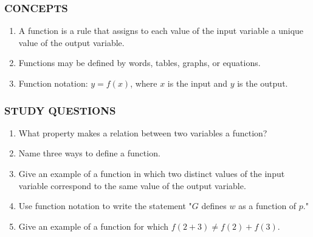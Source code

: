\documentclass[10pt,]{book}
\theoremstyle{plain}
\theoremstyle{definition}
\theoremstyle{definition}
\theoremstyle{definition}
\theoremstyle{definition}
\numberwithin{equation}{part}
\begin{document}
\subsubsection[{CONCEPTS}]{CONCEPTS}\label{subsubsection-6}
\leavevmode%
\begin{enumerate}[label=\arabic*]
\item\hypertarget{li-327}{}A function is a rule that assigns to each value of the input variable a unique value of the output variable.%
\item\hypertarget{li-328}{}Functions may be defined by words, tables, graphs, or equations.%
\item\hypertarget{li-329}{}Function notation: \(y = f (x)\), where \(x\) is the input and \(y\) is the output.%
\end{enumerate}
%
\typeout{************************************************}
\typeout{************************************************}
\subsubsection[{STUDY QUESTIONS}]{STUDY QUESTIONS}\label{subsubsection-7}
\leavevmode%
\begin{enumerate}[label=\arabic*]
\item\hypertarget{li-330}{}What property makes a relation between two variables a function?%
\item\hypertarget{li-331}{}Name three ways to define a function.%
\item\hypertarget{li-332}{}Give an example of a function in which two distinct values of the input variable correspond to the same value of the output variable.%
\item\hypertarget{li-333}{}Use function notation to write the statement "\(G\) defines \(w\) as a function of \(p\)."%
\item\hypertarget{li-334}{}Give an example of a function for which \(f (2 + 3)\ne f (2) + f (3)\).%
\end{enumerate}
%
\typeout{************************************************}
\typeout{************************************************}
\end{document}
